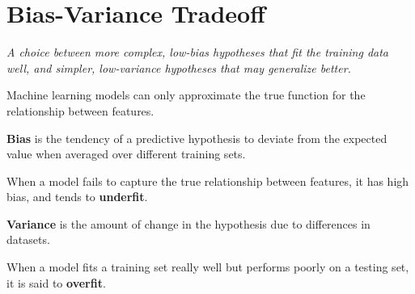 \section{Bias-Variance Tradeoff}
\emph{A choice between more complex, low-bias hypotheses that fit the training data well, and simpler,
low-variance hypotheses that may generalize better.
}

Machine learning models can only approximate the true function for the relationship
between features.

\textbf{Bias} is the tendency of a predictive hypothesis to deviate from the expected value
when averaged over different training sets.

When a model fails to capture the true relationship between features,
it has high bias, and tends to \textbf{underfit}.

\textbf{Variance} is the amount of change in the hypothesis due to 
differences in datasets.

When a model fits a training set really well but performs poorly on a testing set,
it is said to \textbf{overfit}.
